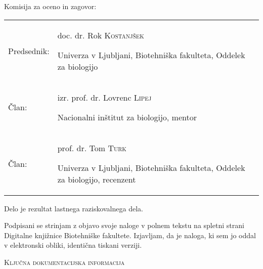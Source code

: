 \vspace{4cm}

Komisija za oceno in zagovor:\\

\begin{table}[ht] %
 \begin{tabular}{>{\raggedright} m{4cm} m{10cm}}
  Predsednik: & doc. dr. Rok \textsc{Kostanjšek} \par Univerza v Ljubljani, Biotehniška fakulteta, Oddelek za biologijo \\ [10pt]
  Član: & izr. prof. dr. Lovrenc \textsc{Lipej} \par Nacionalni inštitut za biologijo, mentor \\ [10pt]
  Član: & prof. dr. Tom \textsc{Turk} \par Univerza v Ljubljani, Biotehniška fakulteta, Oddelek za biologijo, recenzent \\
 \end{tabular}
\end{table}

Delo je rezultat lastnega raziskovalnega dela.

Podpisani se strinjam z objavo svoje naloge v polnem tekstu na spletni strani Digitalne knjižnice Biotehniške fakultete. Izjavljam, da je naloga, ki sem jo oddal v elektronski obliki, identična tiskani verziji.
\vspace{1cm}
\begin{flushright}
 \avtor
\end{flushright}

\newpage
\begin{center}
\textsc{Ključna dokumentacijska informacija} %
\end{center}

